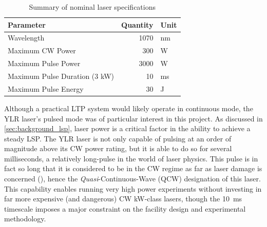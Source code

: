             \begin{table}[h]
                \centering
                \caption{Summary of nominal laser specifications}
                \label{tab:laser_spec}
                \begin{tabular}{@{}lrl@{}}
                    \toprule
                    Parameter            & Quantity & Unit \\ \midrule
                    Wavelength                    & 1070              & nm            \\
                    Maximum CW Power              & 300               & W             \\
                    Maximum Pulse Power           & 3000              & W             \\
                    Maximum Pulse Duration (3 kW) & 10                & ms            \\
                    Maximum Pulse Energy          & 30              & J             \\ \bottomrule
                    \end{tabular}
            \end{table}

            Although a practical LTP system would likely operate in continuous mode, the YLR laser's pulsed mode was of particular interest in this project. As discussed in \autoref{sec:background_lsp}, laser power is a critical factor in the ability to achieve a steady LSP. The YLR laser is not only capable of pulsing at an order of magnitude above its CW power rating, but it is able to do so for several milliseconds, a relatively long-pulse in the world of laser physics. This pulse is in fact so long that it is considered to be in the CW regime as far as laser damage is concerned (\textcite{thorlabsNBK7PlanoConvexLenses}), hence the \emph{Quasi}-Continuous-Wave (QCW) designation of this laser. This capability enables running very high power experiments without investing in far more expensive (and dangerous) CW kW-class lasers, though the 10~ms timescale imposes a major constraint on the facility design and experimental methodology.
        

